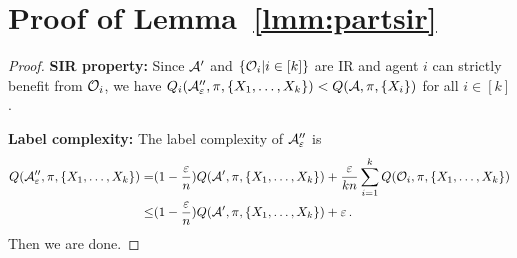 \section{Proof of Lemma~\ref{lmm:partsir}}\label{app:part-sir}
\begin{proof}
\textbf{SIR property: } Since $\mathcal{A}'$ and $\{\mathcal{O}_i|i\in [k]\}$ are IR and agent $i$ can strictly benefit from $\mathcal{O}_i$, 
we have $Q_i(\mathcal{A}_\varepsilon'', \pi, \{X_1,\ldots,X_k\}) < Q(\mathcal{A},\pi, \{X_i\})$ for all $i\in [k]$.

\textbf{Label complexity: } The label complexity of $\mathcal{A}_\varepsilon''$ is
\begin{align*}
    Q(\mathcal{A}_\varepsilon'',\pi, \{X_1,\ldots,X_k\}) = & (1-\frac{\varepsilon}{n})Q(\mathcal{A}',\pi,\{X_1,\ldots,X_k\}) + \frac{\varepsilon}{kn} \sum_{i=1}^k Q(\mathcal{O}_i,\pi,\{X_1,\ldots,X_k\})\\
    \leq& (1-\frac{\varepsilon}{n})Q(\mathcal{A}',\pi,\{X_1,\ldots,X_k\}) + \varepsilon\,.
\end{align*}
Then we are done.
\end{proof}